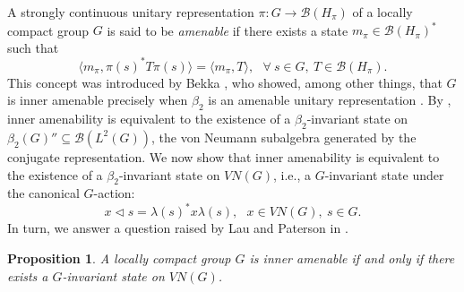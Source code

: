 \documentclass[preprint,12pt]{elsarticle}
\newtheorem{prop}[thm]{Proposition}
\newcommand{\mc}[1]{\mathcal{#1}}
\newcommand{\e}[1]{\emph{#1}}
\newcommand{\la}{\langle}
\newcommand{\ra}{\rangle}
\newcommand{\LG}{VN(G)}
\newcommand{\BLT}{\mc{B}(L^2(G))}
\newcommand{\lm}{\lambda}
\begin{document}
A strongly continuous unitary representation $\pi:G\rightarrow\mc{B}(H_\pi)$ of a locally compact group $G$ is said to be \e{amenable} if there exists a state $m_\pi\in\mc{B}(H_\pi)^*$ such that
$$\la m_\pi,\pi(s)^*T\pi(s)\ra=\la m_\pi,T\ra, \ \ \ \forall \ s\in G, \ T\in\mc{B}(H_\pi).$$
This concept was introduced by Bekka \cite{Bekka}, who showed, among other things, that $G$ is inner amenable precisely when $\beta_2$ is an amenable unitary representation \cite[Theorem 2.4]{Bekka}. By \cite[Proposition 3.1]{St1}, inner amenability is equivalent to the existence of a $\beta_2$-invariant state on $\beta_2(G)''\subseteq\BLT$, the von Neumann subalgebra generated by the conjugate representation. We now show that inner amenability is equivalent to the existence of a $\beta_2$-invariant state on $\LG$, i.e., a $G$-invariant state under the canonical $G$-action:
$$x\lhd s=\lm(s)^*x\lm(s), \ \ \ x\in\LG, \ s\in G.$$
In turn, we answer a question raised by Lau and Paterson in \cite[Example 5]{LP2}.

\begin{prop}\label{p:IA} A locally compact group $G$ is inner amenable if and only if there exists a $G$-invariant state on $\LG$.\end{prop}
\end{document}
